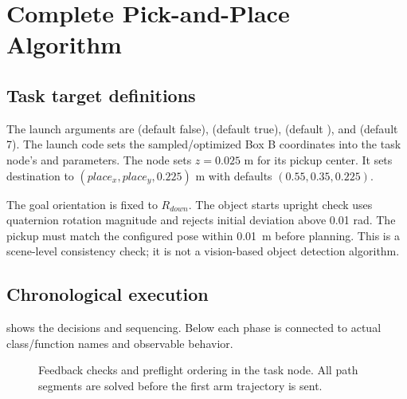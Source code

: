 \chapter{Complete Pick-and-Place Algorithm}
\label{ch:task}

\section{Task target definitions}
The launch arguments are  (default false), 
(default true),  (default ), and 
(default 7). The launch code sets the sampled/optimized Box B coordinates into
the task node's  and  parameters. The node
sets $z=0.025$ m for its pickup center. It sets destination to
$(place_x,place_y,0.225)$ m with defaults $(0.55,0.35,0.225)$.

The goal orientation is fixed to $R_{down}$. The object starts upright check
uses quaternion rotation magnitude and rejects initial deviation above 0.01
rad. The pickup must match the configured pose within \SI{0.01}{m} before
planning. This is a scene-level consistency check; it is not a vision-based
object detection algorithm.

\section{Chronological execution}
 shows the decisions and sequencing. Below each phase is
connected to actual class/function names and observable behavior.

\begin{figure}[htbp]
\centering\resizebox{.75\textwidth}{!}{}
\caption{Feedback checks and preflight ordering in the task node. All path
segments are solved before the first arm trajectory is sent.}
\label{fig:workflow}
\end{figure}

